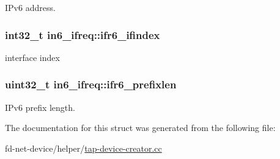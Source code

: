 I\+Pv6 address. 

\subsubsection[{\texorpdfstring{ifr6\+\_\+ifindex}{ifr6_ifindex}}]{\setlength{\rightskip}{0pt plus 5cm}int32\+\_\+t in6\+\_\+ifreq\+::ifr6\+\_\+ifindex}\hypertarget{structin6__ifreq_a9abf044d86eb728f5bb4869d20290a55}{}\label{structin6__ifreq_a9abf044d86eb728f5bb4869d20290a55}


interface index 

\subsubsection[{\texorpdfstring{ifr6\+\_\+prefixlen}{ifr6_prefixlen}}]{\setlength{\rightskip}{0pt plus 5cm}uint32\+\_\+t in6\+\_\+ifreq\+::ifr6\+\_\+prefixlen}\hypertarget{structin6__ifreq_aaa90545d34462d8eac46393ea8a5469c}{}\label{structin6__ifreq_aaa90545d34462d8eac46393ea8a5469c}


I\+Pv6 prefix length. 



The documentation for this struct was generated from the following file\+:\begin{DoxyCompactItemize}
\item 
fd-\/net-\/device/helper/\hyperlink{tap-device-creator_8cc}{tap-\/device-\/creator.\+cc}\end{DoxyCompactItemize}
